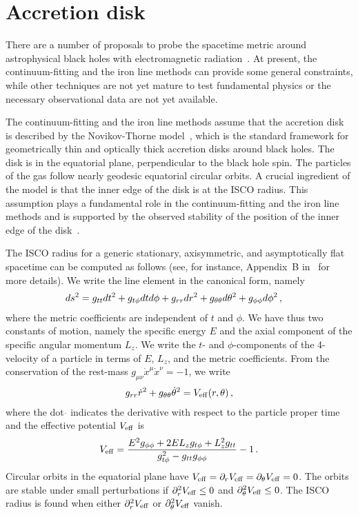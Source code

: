 \documentclass[aps, prd, amsmath, floats, floatfix, twocolumn, nofootinbib, superscriptaddress, showpacs]{revtex4-1}
\newcommand{\be}{\begin{eqnarray}}
\newcommand{\ee}{\end{eqnarray}}
\begin{document}
\section{Accretion disk}

There are a number of proposals to probe the spacetime metric around astrophysical black holes with electromagnetic radiation~\cite{review,review2}. At present, the continuum-fitting and the iron line methods can provide some general constraints, while other techniques are not yet mature to test fundamental physics or the necessary observational data are not yet available.


The continuum-fitting and the iron line methods assume that the accretion disk is described by the Novikov-Thorne model~\cite{nt1,nt2}, which is the standard framework for geometrically thin and optically thick accretion disks around black holes. The disk is in the equatorial plane, perpendicular to the black hole spin. The particles of the gas follow nearly geodesic equatorial circular orbits. A crucial ingredient of the model is that the inner edge of the disk is at the ISCO radius. This assumption plays a fundamental role in the continuum-fitting and the iron line methods and is supported by the observed stability of the position of the inner edge of the disk~\cite{jack}.


The ISCO radius for a generic stationary, axisymmetric, and asymptotically flat spacetime can be computed as follows (see, for instance, Appendix~B in~\cite{enrico} for more details). We write the line element in the canonical form, namely
\be
\hspace{-0.4cm}
ds^2 = g_{tt} dt^2 + g_{t\phi} dt d\phi + g_{rr} dr^2 
+ g_{\theta\theta} d\theta^2 + g_{\phi\phi} d\phi^2 \, ,
\ee
where the metric coefficients are independent of $t$ and $\phi$. We have thus two constants of motion, namely the specific energy $E$ and the axial component of the specific angular momentum $L_z$. We write the $t$- and $\phi$-components of the 4-velocity of a particle in terms of $E$, $L_z$, and the metric coefficients. From the conservation of the rest-mass $g_{\mu\nu} \dot{x}^\mu \dot{x}^\nu = - 1$, we write
\be
g_{rr} \dot{r}^2 + g_{\theta\theta} \dot{\theta}^2 = V_{\rm eff} (r, \theta) \, ,
\ee
where the dot $\dot{}$ indicates the derivative with respect to the particle proper time and the effective potential $V_{\rm eff}$ is
\be
V_{\rm eff} = \frac{E^2 g_{\phi\phi} + 2 E L_z g_{t\phi} 
+ L_z^2 g_{tt}}{g_{t\phi}^2 - g_{tt}g_{\phi\phi}} - 1 \, .
\ee
Circular orbits in the equatorial plane have $V_{\rm eff} = \partial_r V_{\rm eff} = \partial_\theta V_{\rm eff} = 0$. The orbits are stable under small perturbations if $\partial^2_r V_{\rm eff} \le 0$ and $\partial^2_\theta V_{\rm eff} \le 0$. The ISCO radius is found when either $\partial^2_r V_{\rm eff}$ or $\partial^2_\theta V_{\rm eff}$ vanish.
\end{document}
